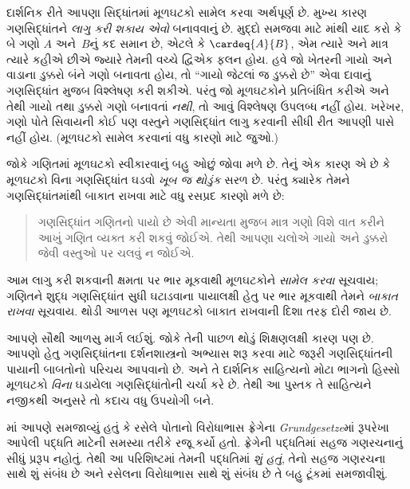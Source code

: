 દાર્શનિક રીતે આપણા સિદ્ધાંતમાં મૂળઘટકો સામેલ કરવા અર્થપૂર્ણ છે.
મુખ્ય કારણ ગણસિદ્ધાંતને \emph{લાગુ કરી શકાય એવો} બનાવવાનું છે.
મુદ્દો સમજવા માટે માંથી યાદ કરો કે બે ગણો
$A$ અને~$B$નું કદ સમાન છે, એટલે કે $\cardeq{A}{B}$, એમ ત્યારે
અને માત્ર ત્યારે કહીએ છીએ જ્યારે તેમની વચ્ચે દ્વિએક ફલન હોય.
હવે જો ખેતરની ગાયો અને વાડાના ડુક્કરો બંને ગણો બનાવતા હોય, તો
``ગાયો જેટલાં જ ડુક્કરો છે'' એવા દાવાનું ગણસિદ્ધાંત મુજબ વિશ્લેષણ
કરી શકીએ. પરંતુ જો મૂળઘટકોને પ્રતિબંધિત કરીએ અને તેથી ગાયો તથા
ડુક્કરો ગણો બનાવતાં \emph{નથી}, તો આવું વિશ્લેષણ ઉપલબ્ધ નહીં હોય.
ખરેખર, ગણો પોતે સિવાયની કોઈ પણ વસ્તુને ગણસિદ્ધાંત લાગુ કરવાની
સીધી રીત આપણી પાસે નહીં હોય. (મૂળઘટકો સામેલ કરવાનાં વધુ કારણો
માટે \citealt[pp.~vi, 24, 50--1]{Potter2004} જુઓ.)

જોકે ગણિતમાં મૂળઘટકો સ્વીકારવાનું બહુ ઓછું જોવા મળે છે. તેનું
એક કારણ એ છે કે મૂળઘટકો વિના ગણસિદ્ધાંત ઘડવો \emph{ખૂબ જ થોડુંક}
સરળ છે. પરંતુ ક્યારેક તેમને ગણસિદ્ધાંતમાંથી બાકાત રાખવા માટે
વધુ રસપ્રદ કારણો મળે છે:
\begin{quote}
ગણસિદ્ધાંત ગણિતનો પાયો છે એવી માન્યતા મુજબ માત્ર ગણો વિશે વાત
કરીને આખું ગણિત વ્યક્ત કરી શકવું જોઈએ. તેથી આપણા ચલોએ ગાયો
અને ડુક્કરો જેવી વસ્તુઓ પર ચલવું ન જોઈએ.
\citep[p.~8]{Kunen1980}
\end{quote}
આમ લાગુ કરી શકવાની ક્ષમતા પર ભાર મૂકવાથી મૂળઘટકોને
\emph{સામેલ કરવા} સૂચવાય; ગણિતને શુદ્ધ ગણસિદ્ધાંત સુધી ઘટાડવાના
પાયાલક્ષી હેતુ પર ભાર મૂકવાથી તેમને \emph{બાકાત રાખવા} સૂચવાય.
થોડી આળસ પણ મૂળઘટકો બાકાત રાખવાની દિશા તરફ દોરી જાય છે.

આપણે સૌથી આળસુ માર્ગ લઈશું. જોકે તેની પાછળ થોડું શિક્ષણલક્ષી
કારણ પણ છે. આપણો હેતુ ગણસિદ્ધાંતના દર્શનશાસ્ત્રનો અભ્યાસ શરૂ
કરવા માટે જરૂરી ગણસિદ્ધાંતની પાયાની બાબતોનો પરિચય આપવાનો છે.
અને તે દાર્શનિક સાહિત્યનો મોટા ભાગનો હિસ્સો મૂળઘટકો
\emph{વિના} ઘડાયેલા ગણસિદ્ધાંતોની ચર્ચા કરે છે. તેથી આ પુસ્તક
તે સાહિત્યને નજીકથી અનુસરે તો કદાચ વધુ ઉપયોગી બને.
\endgroup

\begingroup
\makeatletter{}\makeatother


\label{guunit:OLP-0536}


માં આપણે સમજાવ્યું હતું કે રસેલે પોતાનો
વિરોધાભાસ ફ્રેગેના \emph{Grundgesetze}માં રૂપરેખા આપેલી પદ્ધતિ
માટેની સમસ્યા તરીકે રજૂ કર્યો હતો. ફ્રેગેની પદ્ધતિમાં સહજ ગણરચનાનું
સીધું પ્રરૂપ નહોતું. તેથી આ પરિશિષ્ટમાં તેમની પદ્ધતિમાં
\emph{શું હતું}, તેનો સહજ ગણરચના સાથે શું સંબંધ છે અને રસેલના
વિરોધાભાસ સાથે શું સંબંધ છે તે બહુ ટૂંકમાં સમજાવીશું.

